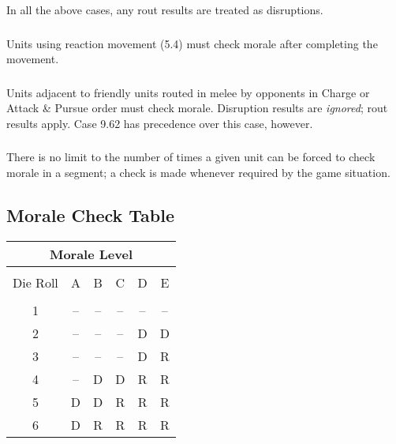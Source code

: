 In all the above cases, any rout results are treated as disruptions.

\subsubsection[Reaction Movement]{} Units using reaction movement (5.4) must check morale after completing the movement.

\subsubsection[Adjacent Units]{} Units adjacent to friendly units routed in melee by opponents in Charge or Attack \& Pursue order must check morale. Disruption results are \textit{ignored}; rout results apply. Case 9.62 has precedence over this case, however.

\subsubsection[No Limits]{} There is no limit to the number of times a given unit can be forced to check morale in a segment; a check is made whenever required by the game situation.

\subsection{Morale Check Table}

\begin{tabular}{ |cccccc| }
    \multicolumn{6}{c}{ \textbf{Morale Level}} \\
    \hline & & & & & \\[-2.0ex]
    Die Roll & A & B & C & D & E \\
    \hline \\ [-2.0ex]
    1 & -- & -- & -- & -- & -- \\
    2 & -- & -- & -- & D & D \\
    3 & -- & -- & -- & D & R \\
    4 & -- & D & D & R & R \\
    5 & D & D & R & R & R \\
    6 & D & R & R & R & R \\
    \hline
\end{tabular}